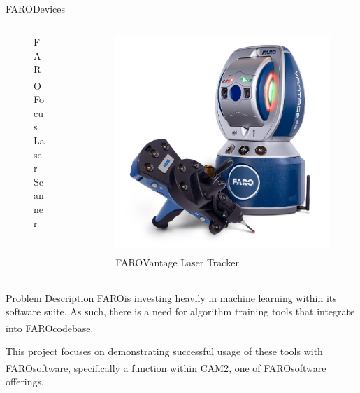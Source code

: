 \documentclass[10pt]{beamer}
\newcommand{\faro}[0]{FARO\textsuperscript{\textregistered}\space}
\begin{document}
\begin{frame}{\faro Devices}
\begin{columns}
\begin{column}{0.30\textwidth}
\begin{figure}
          \caption{\newline\faro Focus Laser Scanner}
        \end{figure}
      \end{column}
      \begin{column}{0.30\textwidth}
        \begin{figure}
          \centering
          \includegraphics[width=\textwidth]{images/faro-probe.jpg}
          \caption{\newline\faro Vantage Laser Tracker}
        \end{figure}
      \end{column}
    \end{columns}
  \end{frame}
  \begin{frame}{Problem Description}
    \faro is investing heavily  in machine learning within its software suite. As such, there is a need for algorithm training tools that integrate into \faro codebase.

    This project focuses on demonstrating successful usage of these tools with \faro software, specifically a function within CAM2\textsuperscript{\textregistered}, one of \faro software offerings. 
  \end{frame}
\end{document}
